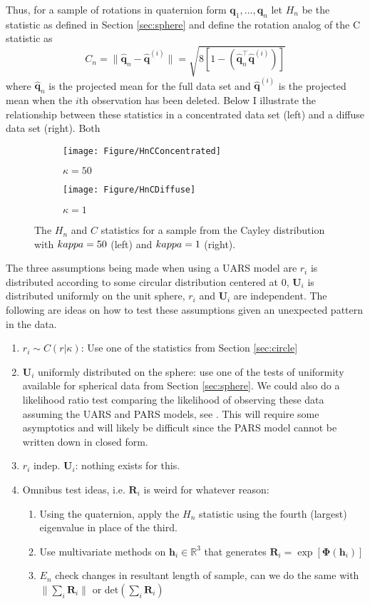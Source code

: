\documentclass{article}\usepackage{graphicx, color}
\newcommand{\R}{{\mathbb{R}}}
\begin{document}
Thus, for a sample of rotations in quaternion form $\bm q_1,\dots,\bm q_n$ let $H_n$ be the statistic as defined in Section \ref{sec:sphere} and define the rotation analog of the C statistic as 
\[
C_n=\|\hat{\bm q}_n-\hat{\bm q}^{(i)}\|=\sqrt{8[1-(\hat{\bm q}_n^\top\hat{\bm q}^{(i)})]}
\]
where $\hat{\bm q}_n$ is the projected mean for the full data set and $\hat{\bm q}^{(i)}$ is the projected mean when the $i$th observation has been deleted.  Below I illustrate the relationship between these statistics in a concentrated data set (left) and a diffuse data set (right).  Both




\begin{figure}
\centering
\begin{subfigure}[b]{0.45\textwidth}
        \texttt{[image: Figure/HnCConcentrated]}
        \caption{$\kappa=50$}
\end{subfigure}
\begin{subfigure}[b]{0.45\textwidth}
        \texttt{[image: Figure/HnCDiffuse]}
        \caption{$\kappa=1$}
\end{subfigure}
\caption{The $H_n$ and $C$ statistics for a sample from the Cayley distribution with $\\kappa=50$ (left) and $\\kappa=1$ (right).}
\label{fig:HnC}
\end{figure}

The three assumptions being made when using a UARS model are $r_i$ is distributed according to some circular distribution centered at $0$, $\bm U_i$ is distributed uniformly on the unit sphere, $r_i$ and $\bm U_i$ are independent.  The following are ideas on how to test these assumptions given an unexpected pattern in the data.
\begin{enumerate}
\item $r_i\sim C(r|\kappa)$: Use one of the statistics from Section \ref{sec:circle}
\item $\bm U_i$ uniformly distributed on the sphere:  use one of the tests of uniformity available for spherical data from Section \ref{sec:sphere}.  We could also do a likelihood ratio test comparing the likelihood of observing these data assuming the UARS and PARS models, see  \cite{bingham2012}.  This will require some asymptotics and will likely be difficult since the PARS model cannot be written down in closed form.
\item $r_i$ indep. $\bm U_i$: nothing exists for this.  
\item Omnibus test ideas, i.e. $\bm R_i$ is weird for whatever reason:
\begin{enumerate}
\item Using the quaternion, apply the $H_n$ statistic using the fourth (largest) eigenvalue in place of the third.
\item Use multivariate methods on $\bm h_i\in\R^3$ that generates $\bm R_i=\exp[\bm{\Phi}(\bm h_i)]$
\item $E_n$ check changes in resultant length of sample, can we do the same with $\|\sum_i\bm R_i\|$ or det$(\sum_i \bm R_i)$
\end{enumerate}
\end{enumerate}


\end{document}
